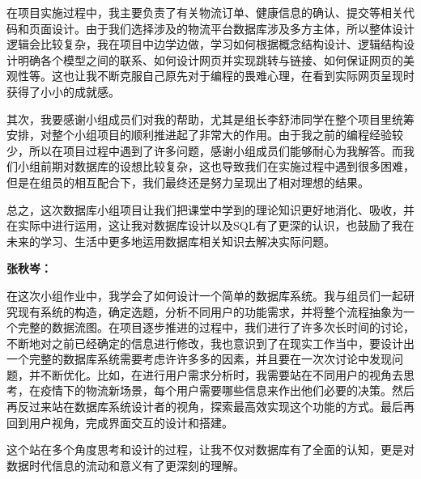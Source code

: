 \documentclass[12pt]{article}
\begin{document}
在项目实施过程中，我主要负责了有关物流订单、健康信息的确认、提交等相关代码和页面设计。由于我们选择涉及的物流平台数据库涉及多方主体，所以整体设计逻辑会比较复杂，我在项目中边学边做，学习如何根据概念结构设计、逻辑结构设计明确各个模型之间的联系、如何设计网页并实现跳转与链接、如何保证网页的美观性等。这也让我不断克服自己原先对于编程的畏难心理，在看到实际网页呈现时获得了小小的成就感。

其次，我要感谢小组成员们对我的帮助，尤其是组长李舒沛同学在整个项目里统筹安排，对整个小组项目的顺利推进起了非常大的作用。由于我之前的编程经验较少，所以在项目过程中遇到了许多问题，感谢小组成员们能够耐心为我解答。而我们小组前期对数据库的设想比较复杂，这也导致我们在实施过程中遇到很多困难，但是在组员的相互配合下，我们最终还是努力呈现出了相对理想的结果。

总之，这次数据库小组项目让我们把课堂中学到的理论知识更好地消化、吸收，并在实际中进行运用，这让我对数据库设计以及SQL有了更深的认识，也鼓励了我在未来的学习、生活中更多地运用数据库相关知识去解决实际问题。

\vspace{0.3cm}
\noindent\textbf{张秋岑：}\par
在这次小组作业中，我学会了如何设计一个简单的数据库系统。我与组员们一起研究现有系统的构造，确定选题，分析不同用户的功能需求，并将整个流程抽象为一个完整的数据流图。在项目逐步推进的过程中，我们进行了许多次长时间的讨论，不断地对之前已经确定的信息进行修改，我也意识到了在现实工作当中，要设计出一个完整的数据库系统需要考虑许许多多的因素，并且要在一次次讨论中发现问题，并不断优化。比如，在进行用户需求分析时，我需要站在不同用户的视角去思考，在疫情下的物流新场景，每个用户需要哪些信息来作出他们必要的决策。然后再反过来站在数据库系统设计者的视角，探索最高效实现这个功能的方式。最后再回到用户视角，完成界面交互的设计和搭建。

这个站在多个角度思考和设计的过程，让我不仅对数据库有了全面的认知，更是对数据时代信息的流动和意义有了更深刻的理解。
\end{document}
